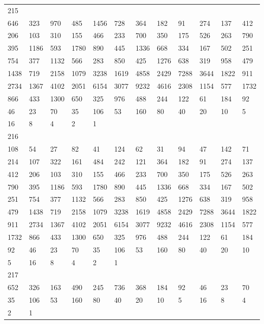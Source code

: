 \begin{longtable}{llllllllllll}
215&&&&&&&&&&&\\
646& 323& 970& 485& 1456& 728& 364& 182& 91& 274& 137& 412\\
206& 103& 310& 155& 466& 233& 700& 350& 175& 526& 263& 790\\
395& 1186& 593& 1780& 890& 445& 1336& 668& 334& 167& 502& 251\\
754& 377& 1132& 566& 283& 850& 425& 1276& 638& 319& 958& 479\\
1438& 719& 2158& 1079& 3238& 1619& 4858& 2429& 7288& 3644& 1822& 911\\
2734& 1367& 4102& 2051& 6154& 3077& 9232& 4616& 2308& 1154& 577& 1732\\
866& 433& 1300& 650& 325& 976& 488& 244& 122& 61& 184& 92\\
46& 23& 70& 35& 106& 53& 160& 80& 40& 20& 10& 5\\
16& 8& 4& 2& 1& \\

216&&&&&&&&&&&\\
108& 54& 27& 82& 41& 124& 62& 31& 94& 47& 142& 71\\
214& 107& 322& 161& 484& 242& 121& 364& 182& 91& 274& 137\\
412& 206& 103& 310& 155& 466& 233& 700& 350& 175& 526& 263\\
790& 395& 1186& 593& 1780& 890& 445& 1336& 668& 334& 167& 502\\
251& 754& 377& 1132& 566& 283& 850& 425& 1276& 638& 319& 958\\
479& 1438& 719& 2158& 1079& 3238& 1619& 4858& 2429& 7288& 3644& 1822\\
911& 2734& 1367& 4102& 2051& 6154& 3077& 9232& 4616& 2308& 1154& 577\\
1732& 866& 433& 1300& 650& 325& 976& 488& 244& 122& 61& 184\\
92& 46& 23& 70& 35& 106& 53& 160& 80& 40& 20& 10\\
5& 16& 8& 4& 2& 1& \\

217&&&&&&&&&&&\\
652& 326& 163& 490& 245& 736& 368& 184& 92& 46& 23& 70\\
35& 106& 53& 160& 80& 40& 20& 10& 5& 16& 8& 4\\
2& 1& \\


\end{longtable}
